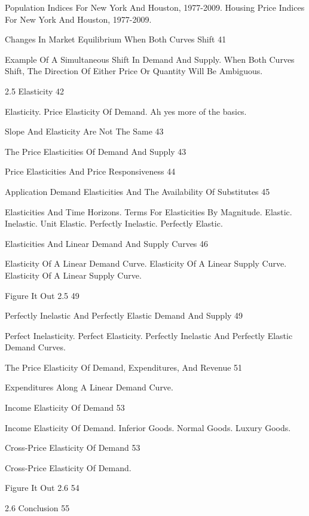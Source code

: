 Population Indices For New York And Houston, 1977-2009. Housing Price Indices For New York And Houston, 1977-2009.

Changes In Market Equilibrium When Both Curves Shift 41

Example Of A Simultaneous Shift In Demand And Supply. When Both Curves Shift, The Direction Of Either Price Or Quantity Will Be Ambiguous.

2.5 Elasticity 42

Elasticity. Price Elasticity Of Demand. Ah yes more of the basics.

Slope And Elasticity Are Not The Same 43



The Price Elasticities Of Demand And Supply 43



Price Elasticities And Price Responsiveness 44



Application Demand Elasticities And The Availability Of Substitutes 45

Elasticities And Time Horizons. Terms For Elasticities By Magnitude. Elastic. Inelastic. Unit Elastic. Perfectly Inelastic. Perfectly Elastic.

Elasticities And Linear Demand And Supply Curves 46

Elasticity Of A Linear Demand Curve. Elasticity Of A Linear Supply Curve. Elasticity Of A Linear Supply Curve.

Figure It Out 2.5 49



Perfectly Inelastic And Perfectly Elastic Demand And Supply 49

Perfect Inelasticity. Perfect Elasticity. Perfectly Inelastic And Perfectly Elastic Demand Curves.

The Price Elasticity Of Demand, Expenditures, And Revenue 51

Expenditures Along A Linear Demand Curve.

Income Elasticity Of Demand 53

Income Elasticity Of Demand. Inferior Goods. Normal Goods. Luxury Goods.

Cross-Price Elasticity Of Demand 53

Cross-Price Elasticity Of Demand.

Figure It Out 2.6 54



2.6 Conclusion 55



